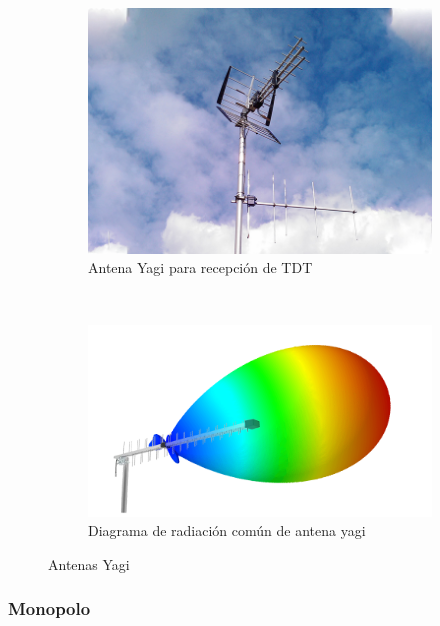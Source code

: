 \begin{figure}[h]
\centering
	\begin{subfigure}[b]{0.45\textwidth}
    \centering
        \includegraphics[width=\textwidth]{archivos/dipolo/yagi}
        \caption{Antena Yagi para recepción de TDT \citep{Pearce2010}}
        \label{fig:yagi}
	\end{subfigure}
~ %
	\begin{subfigure}[b]{0.45\textwidth} %
	\centering
		\includegraphics[width=\textwidth]{archivos/yagipat} %
		\caption{Diagrama de radiación común de antena yagi}
		\label{fig:yagirad}
	\end{subfigure}
\caption{Antenas Yagi}\label{fig:yagis}
\end{figure}

\subsubsection{Monopolo}

